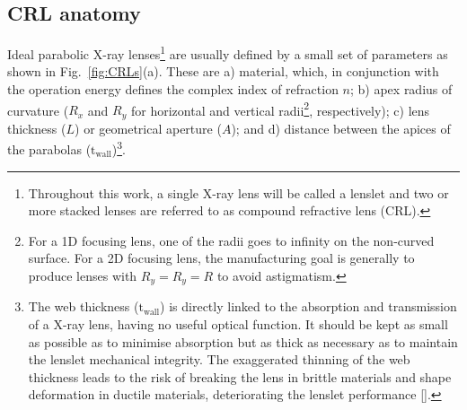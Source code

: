 \begin{refsection}
\subsection{CRL anatomy}\label{sec:CRL_anatomy}

Ideal parabolic X-ray lenses\footnote{Throughout this work, a single X-ray lens will be called a lenslet and two or more stacked lenses are referred to as compound refractive lens (CRL).} are usually defined by a small set of parameters as shown in Fig.~\ref{fig:CRLs}(a). These are a) material, which, in conjunction with the operation energy defines the complex index of refraction $n$; b) apex radius of curvature ($R_x$ and $R_y$ for horizontal and vertical radii\footnote{For a 1D focusing lens, one of the radii goes to infinity on the non-curved surface. For a 2D focusing lens, the manufacturing goal is generally to produce lenses with $R_y=R_y=R$ to avoid astigmatism.}, respectively); c) lens thickness ($L$) or geometrical aperture ($A$); and d) distance between the apices of the parabolas ($\text{t}_{\text{wall}}$)\footnote{The web thickness ($\text{t}_{\text{wall}}$) is directly linked to the absorption and transmission of a X-ray lens, having no useful optical function. It should be kept as small as possible as to minimise absorption but as thick as necessary as to maintain the lenslet mechanical integrity. The exaggerated thinning of the web thickness leads to the risk of breaking the lens in brittle materials and shape deformation in ductile materials, deteriorating the lenslet performance [\cite{Lengeler1998}].}.


\end{refsection}
